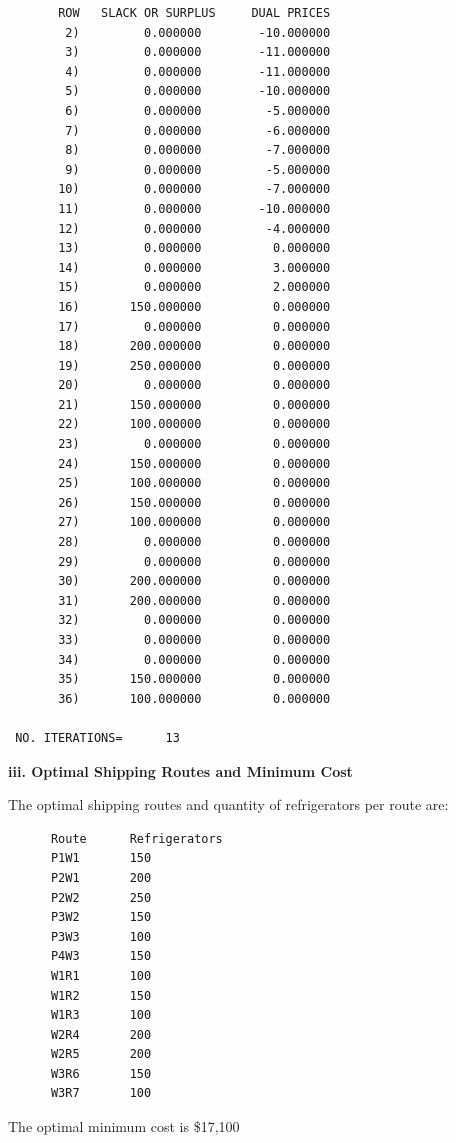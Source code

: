 \documentclass[paper=a4, fontsize=11pt]{scrartcl} %
\numberwithin{equation}{section} %
\numberwithin{figure}{section} %
\numberwithin{table}{section} %
\begin{document}
\begin{verbatim}
       ROW   SLACK OR SURPLUS     DUAL PRICES
        2)         0.000000        -10.000000
        3)         0.000000        -11.000000
        4)         0.000000        -11.000000
        5)         0.000000        -10.000000
        6)         0.000000         -5.000000
        7)         0.000000         -6.000000
        8)         0.000000         -7.000000
        9)         0.000000         -5.000000
       10)         0.000000         -7.000000
       11)         0.000000        -10.000000
       12)         0.000000         -4.000000
       13)         0.000000          0.000000
       14)         0.000000          3.000000
       15)         0.000000          2.000000
       16)       150.000000          0.000000
       17)         0.000000          0.000000
       18)       200.000000          0.000000
       19)       250.000000          0.000000
       20)         0.000000          0.000000
       21)       150.000000          0.000000
       22)       100.000000          0.000000
       23)         0.000000          0.000000
       24)       150.000000          0.000000
       25)       100.000000          0.000000
       26)       150.000000          0.000000
       27)       100.000000          0.000000
       28)         0.000000          0.000000
       29)         0.000000          0.000000
       30)       200.000000          0.000000
       31)       200.000000          0.000000
       32)         0.000000          0.000000
       33)         0.000000          0.000000
       34)         0.000000          0.000000
       35)       150.000000          0.000000
       36)       100.000000          0.000000

 NO. ITERATIONS=      13
    \end{verbatim}
    \textbf{iii. Optimal Shipping Routes and Minimum Cost}\newline
    
    The optimal shipping routes and quantity of refrigerators per route are:
    \begin{verbatim}
	  Route      Refrigerators
      P1W1       150
      P2W1       200
      P2W2       250
      P3W2       150
      P3W3       100
      P4W3       150
      W1R1       100
      W1R2       150
      W1R3       100
      W2R4       200
      W2R5       200
      W3R6       150
      W3R7       100
    \end{verbatim}

	The optimal minimum cost is \$17,100\newline
    
\end{document}
